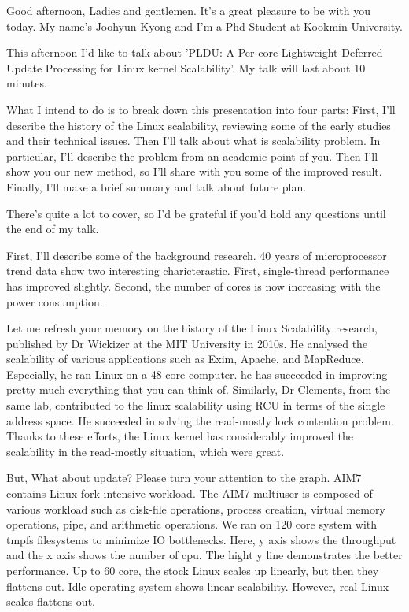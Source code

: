 Good afternoon, Ladies and gentlemen.
It's a great pleasure to be with you today.
My name's Joohyun Kyong and I'm a Phd Student at Kookmin University.

This afternoon I'd like to talk about 'PLDU: A Per-core Lightweight  Deferred
Update Processing  for Linux kernel Scalability'.
My talk will last about 10 minutes.

What I intend to do is to break down this presentation into four parts:
First, I'll describe the history of the Linux scalability, reviewing some of
the early studies and their technical issues.
Then I'll talk about what is scalability problem.
In particular, I'll describe the problem from an academic point of you.
Then I'll show you our new method, 
so I'll share with you some of the improved result.
Finally, I'll make a brief summary and talk about future plan.

There's quite a lot to cover, so I'd be grateful if you'd hold any questions
until the end of my talk.

First, I'll describe some of the background research.
40 years of microprocessor trend data show two interesting charicterastic.
First, single-thread performance has improved slightly.
Second, the number of cores is now increasing with the power consumption. 

Let me refresh your memory on the history of the Linux Scalability research,
published by Dr Wickizer at the MIT University in 2010s.
He analysed the scalability of various applications such as Exim, Apache, and MapReduce.
Especially, he ran Linux on a 48 core computer.
he has succeeded in improving pretty much everything that you
can think of.
Similarly, Dr Clements, from the same lab, contributed to the linux scalability
using RCU in terms of the single address space.
He succeeded in  solving the read-mostly lock contention problem.
Thanks to these efforts, the Linux kernel has considerably improved the
scalability in the read-mostly situation, which were great.

But, What about update? 
Please turn your attention to the graph.
AIM7 contains Linux fork-intensive workload.
The AIM7 multiuser is composed of various workload such as disk-file operations,
process creation, virtual memory operations, pipe, and arithmetic operations.
We ran on 120 core system with tmpfs filesystems to minimize IO bottlenecks.
Here, y axis shows the throughput and the x axis shows the number of cpu.
The hight y line demonstrates the better performance.
Up to 60 core, the stock Linux scales up linearly, but then they flattens out.
Idle operating system shows linear scalability.
However, real Linux scales flattens out.


